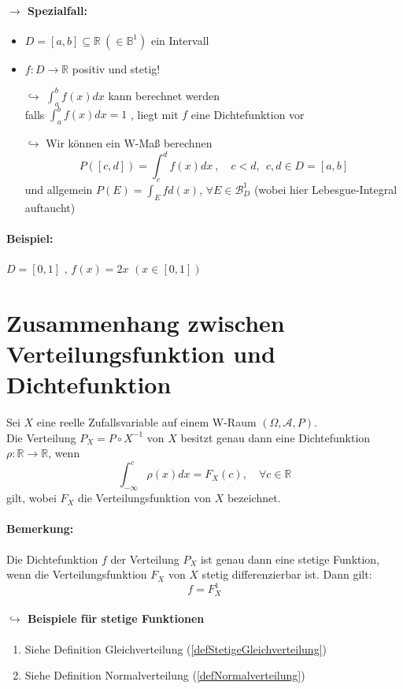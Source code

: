 \documentclass[12pt,a4paper]{article}
\begin{document}
	\paragraph{$\rightarrow$ Spezialfall:}
	\begin{itemize}
		\item $\displaystyle D=[a,b]\subseteq\mathbb{R} \: (\in\mathbb{B}^1)$ ein Intervall
		\item $f:D\rightarrow\mathbb{R}$ positiv und stetig!
		\item[$\hookrightarrow$] $\displaystyle \int^b_a f(x)dx$ kann berechnet werden\\
		falls $\displaystyle \int_a^b f(x)dx=1$ , liegt mit $f$ eine Dichtefunktion vor
		\item[$\hookrightarrow$] Wir können ein W-Maß berechnen
		$$P([c,d])=\int_c^d f(x)dx \: , \quad c<d ,\:\: c,d\in D=[a,b]$$
		und allgemein $\displaystyle P(E)=\int_E fd(x)$, $\forall E\in\mathcal{B}^1_D$ (wobei hier Lebesgue-Integral auftaucht) 
	\end{itemize}

	\paragraph{Beispiel:}
	$D=[0,1]$ , $f(x)=2x$ \quad $(x\in[0,1])$
	
	\section*{Zusammenhang zwischen Verteilungsfunktion und Dichtefunktion}
	Sei $X$ eine reelle Zufallsvariable auf einem W-Raum $(\Omega, \mathcal{A}, P)$.\\
	Die Verteilung $P_X =P\circ X^{-1}$ von $X$ besitzt genau dann eine Dichtefunktion $\rho: \mathbb{R}\rightarrow\mathbb{R}$, wenn 
	$$\int_{-\infty}^c \rho (x)dx = F_X(c), \quad \forall c\in\mathbb{R}$$
	gilt, wobei $F_X$ die Verteilungsfunktion von $X$ bezeichnet.	
	
	\paragraph{Bemerkung:}
	Die Dichtefunktion $f$ der Verteilung $P_X$ ist genau dann eine stetige Funktion, wenn die Verteilungsfunktion $F_X$ von $X$ stetig differenzierbar ist. Dann gilt:
	$$f=F^1_X$$
	
	\paragraph{$\hookrightarrow$ Beispiele für stetige Funktionen}
	\begin{enumerate}
		\item Siehe Definition Gleichverteilung (\ref{defStetigeGleichverteilung})
		\item Siehe Definition Normalverteilung (\ref{defNormalverteilung})
	\end{enumerate}		
	
\end{document}

